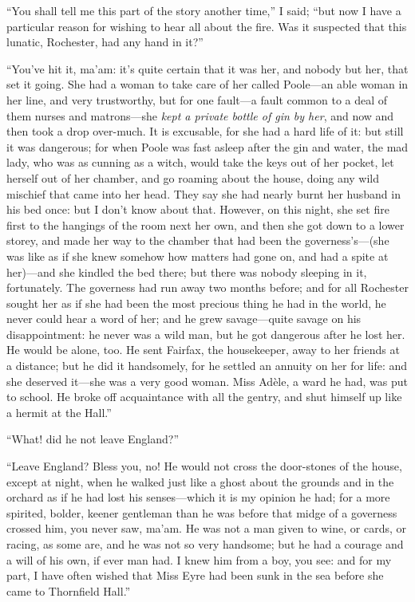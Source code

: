 \enquote{You shall tell me this part of the story another time,} I said;
\enquote{but now I have a particular reason for wishing to hear all
	about the fire. Was it suspected that this lunatic, \Mrs{} Rochester, had
	any hand in it?}

\enquote{You've hit it, ma'am: it's quite certain that it was her, and nobody
	but her, that set it going. She had a woman to take care of her called
	\Mrs{} Poole---an able woman in her line, and very trustworthy, but for
	one fault---a fault common to a deal of them nurses and matrons---she
	\emph{kept a private bottle of gin by her}, and now and then took a drop
	over-much. It is excusable, for she had a hard life of it: but still it
	was dangerous; for when \Mrs{} Poole was fast asleep after the gin and
	water, the mad lady, who was as cunning as a witch, would take the keys
	out of her pocket, let herself out of her chamber, and go roaming about
	the house, doing any wild mischief that came into her head. They say
	she had nearly burnt her husband in his bed once: but I don't know about
	that. However, on this night, she set fire first to the hangings of the
	room next her own, and then she got down to a lower storey, and made her
	way to the chamber that had been the governess's---(she was like as if
	she knew somehow how matters had gone on, and had a spite at her)---and
	she kindled the bed there; but there was nobody sleeping in it,
	fortunately. The governess had run away two months before; and for all
	\Mr{} Rochester sought her as if she had been the most precious thing he
	had in the world, he never could hear a word of her; and he grew
	savage---quite savage on his disappointment: he never was a wild man,
	but he got dangerous after he lost her. He would be alone, too. He
	sent \Mrs{} Fairfax, the housekeeper, away to her friends at a distance;
	but he did it handsomely, for he settled an annuity on her for life: and
	she deserved it---she was a very good woman. Miss Adèle, a ward he had,
	was put to school. He broke off acquaintance with all the gentry, and
	shut himself up like a hermit at the Hall.}

\enquote{What! did he not leave England?}

\enquote{Leave England? Bless you, no! He would not cross the
	door-stones of the house, except at night, when he walked just like a
	ghost about the grounds and in the orchard as if he had lost his
	senses---which it is my opinion he had; for a more spirited, bolder,
	keener gentleman than he was before that midge of a governess crossed
	him, you never saw, ma'am. He was not a man given to wine, or cards, or
	racing, as some are, and he was not so very handsome; but he had a
	courage and a will of his own, if ever man had. I knew him from a boy,
	you see: and for my part, I have often wished that Miss Eyre had been
	sunk in the sea before she came to Thornfield Hall.}

